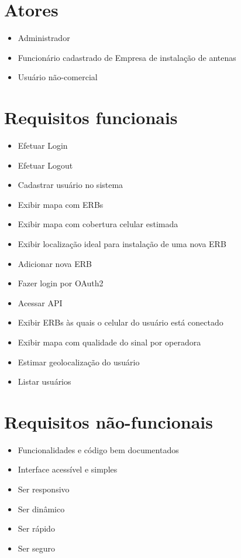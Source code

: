 \documentclass[]{politex}
\begin{document}
\section{Atores}
\begin{itemize}
\item Administrador
\item Funcionário cadastrado de Empresa de instalação de antenas
\item Usuário não-comercial
\end{itemize}

\section{Requisitos funcionais}
\begin{itemize}
\item Efetuar Login
\item Efetuar Logout
\item Cadastrar usuário no sistema
\item Exibir mapa com ERBs
\item Exibir mapa com cobertura celular estimada
\item Exibir localização ideal para instalação de uma nova ERB
\item Adicionar nova ERB
\item Fazer login por OAuth2
\item Acessar API
\item Exibir ERBs às quais o celular do usuário está conectado
\item Exibir mapa com qualidade do sinal por operadora
\item Estimar geolocalização do usuário
\item Listar usuários
\end{itemize}

\section{Requisitos não-funcionais}
\begin{itemize}
\item Funcionalidades e código bem documentados
\item Interface acessível e simples
\item Ser responsivo
\item Ser dinâmico
\item Ser rápido
\item Ser seguro   
\end{itemize}
\end{document}

